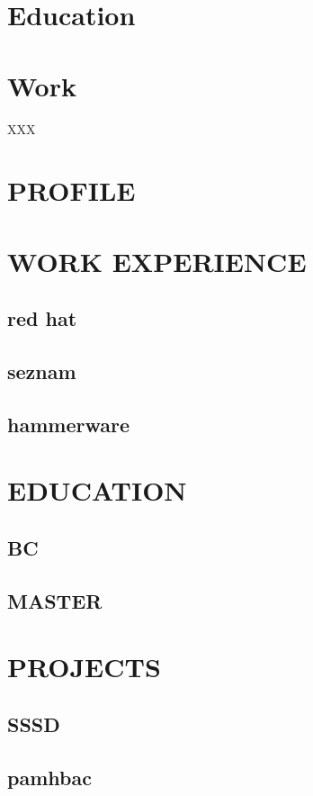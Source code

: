 \documentclass{mycv}
\begin{document}
\begin{paracol}{3}
\section{Education}

\section{Work}{XXX}

\section{PROFILE}

\lipsum[2]

\section{WORK EXPERIENCE}
\subsection{red hat}
\subsection{seznam}
\subsection{hammerware}

\section{EDUCATION}
\subsection{BC}
\subsection{MASTER}

\end{paracol}

\newpage

\section{PROJECTS}

\subsection{SSSD}

\subsection{pamhbac}

\faGithub
\faTwitter
\faMale
\end{document}
